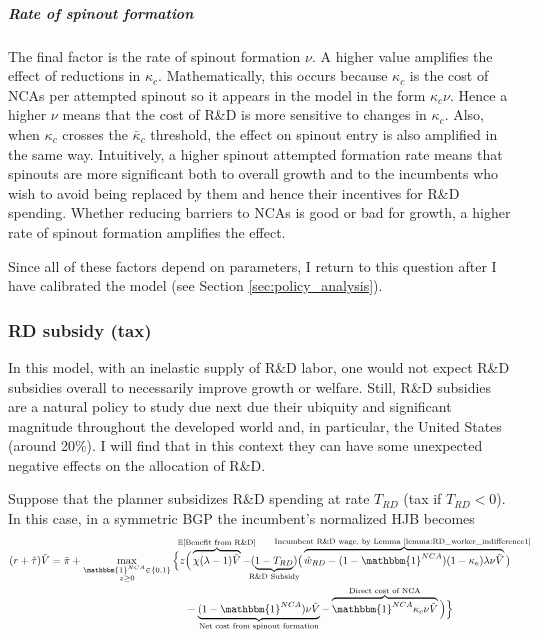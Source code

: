 \documentclass[11pt,english]{article}
\begin{document}
\subparagraph{Rate of spinout formation}

The final factor is the rate of spinout formation $\nu$. A higher value amplifies the effect of reductions in $\kappa_c$. Mathematically, this occurs because $\kappa_c$ is the cost of NCAs per attempted spinout so it appears in the model in the form $\kappa_c \nu$. Hence a higher $\nu$ means that the cost of R\&D is more sensitive to changes in $\kappa_c$. Also, when $\kappa_c$ crosses the $\bar{\kappa}_c$ threshold, the effect on spinout entry is also amplified in the same way. Intuitively, a higher spinout attempted formation rate means that spinouts are more significant both to overall growth and to the incumbents who wish to avoid being replaced by them and hence their incentives for R\&D spending. Whether reducing barriers to NCAs is good or bad for growth, a higher rate of spinout formation amplifies the effect. 

Since all of these factors depend on parameters, I return to this question after I have calibrated the model (see Section \ref{sec:policy_analysis}). 
 

\subsubsection{RD subsidy (tax)}

In this model, with an inelastic supply of R\&D labor, one would not expect R\&D subsidies overall to necessarily improve growth or welfare. Still, R\&D subsidies are a natural policy to study due next due their ubiquity and significant magnitude throughout the developed world and, in particular, the United States (around 20\%). I will find that in this context they can have some unexpected negative effects on the allocation of R\&D.

Suppose that the planner subsidizes R\&D spending at rate $T_{RD}$ (tax if $T_{RD} < 0$). In this case, in a symmetric BGP the incumbent's normalized HJB becomes
\begin{align}
(r + \hat{\tau}) \tilde{V} = \tilde{\pi} + \max_{\substack{\mathbbm{1}^{NCA} \in \{0,1\} \\ z \ge 0}} \Big\{z &\Big( \overbrace{\chi (\lambda - 1) \tilde{V}}^{\mathclap{\mathbb{E}[\textrm{Benefit from R\&D}]}}- (\underbrace{1-T_{RD}}_{\mathclap{\text{R\&D Subsidy}}}) \big( \overbrace{\hat{w}_{RD} - (1-\mathbbm{1}^{NCA})(1-\kappa_e)\lambda \nu \tilde{V}}^{\mathclap{\text{Incumbent R\&D wage, by Lemma \ref{lemma:RD_worker_indifference1} }}}\big) \label{eq:hjb_incumbent_RDsubsidy} \nonumber \\ 
&-  \underbrace{(1-\mathbbm{1}^{NCA}) \nu \tilde{V}}_{\mathclap{\text{Net cost from spinout formation}}} - \overbrace{\mathbbm{1}^{NCA} \kappa_{c} \nu \tilde{V}}^{\mathclap{\text{Direct cost of NCA}}}\Big) \Big\} 
\end{align}
\end{document}
